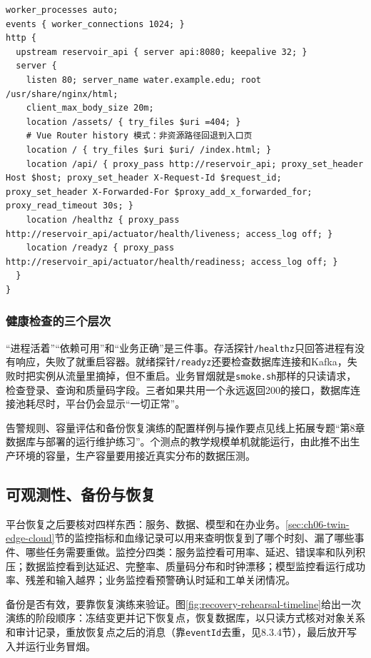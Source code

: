 \begin{lstlisting}[language=Nginx,caption={前端静态资源与 Spring Boot API 的 Nginx 配置},label={lst:ch08-nginx}]
worker_processes auto;
events { worker_connections 1024; }
http {
  upstream reservoir_api { server api:8080; keepalive 32; }
  server {
    listen 80; server_name water.example.edu; root /usr/share/nginx/html;
    client_max_body_size 20m;
    location /assets/ { try_files $uri =404; }
    # Vue Router history 模式：非资源路径回退到入口页
    location / { try_files $uri $uri/ /index.html; }
    location /api/ { proxy_pass http://reservoir_api; proxy_set_header Host $host; proxy_set_header X-Request-Id $request_id; proxy_set_header X-Forwarded-For $proxy_add_x_forwarded_for; proxy_read_timeout 30s; }
    location /healthz { proxy_pass http://reservoir_api/actuator/health/liveness; access_log off; }
    location /readyz { proxy_pass http://reservoir_api/actuator/health/readiness; access_log off; }
  }
}
\end{lstlisting}

\subsubsection{健康检查的三个层次}
“进程活着”“依赖可用”和“业务正确”是三件事。存活探针\texttt{/healthz}只回答进程有没有响应，失败了就重启容器。就绪探针\texttt{/readyz}还要检查数据库连接和Kafka，失败时把实例从流量里摘掉，但不重启。业务冒烟就是\texttt{smoke.sh}那样的只读请求，检查登录、查询和质量码字段。三者如果共用一个永远返回200的接口，数据库连接池耗尽时，平台仍会显示“一切正常”。

告警规则、容量评估和备份恢复演练的配置样例与操作要点见线上拓展专题“第8章数据库与部署的运行维护练习”。\cpStationCount 个测点的教学规模单机就能运行，由此推不出生产环境的容量，生产容量要用接近真实分布的数据压测。

\subsection{可观测性、备份与恢复}\label{sec:ch08-twin-lineage}

平台恢复之后要核对四样东西：服务、数据、模型和在办业务。\ref{sec:ch06-twin-edge-cloud}节的监控指标和血缘记录可以用来查明恢复到了哪个时刻、漏了哪些事件、哪些任务需要重做。监控分四类：服务监控看可用率、延迟、错误率和队列积压；数据监控看到达延迟、完整率、质量码分布和时钟漂移；模型监控看运行成功率、残差和输入越界；业务监控看预警确认时延和工单关闭情况。

备份是否有效，要靠恢复演练来验证。图\ref{fig:recovery-rehearsal-timeline}给出一次演练的阶段顺序：冻结变更并记下恢复点，恢复数据库，以只读方式核对对象关系和审计记录，重放恢复点之后的消息（靠\texttt{eventId}去重，见8.3.4节），最后放开写入并运行业务冒烟。

